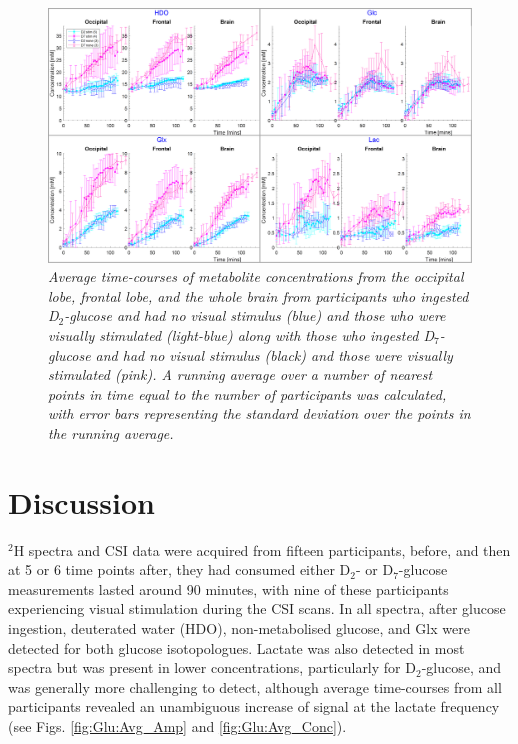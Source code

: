 \begin{figure}
    \centering
    \includegraphics[width = 1\textwidth]{Figures/Glucose/Vis_Stim.png}
    \caption{\textit{Average time-courses of metabolite concentrations from the occipital lobe, frontal lobe, and the whole brain from participants who ingested D$_2$-glucose and had no visual stimulus (blue) and those who were visually stimulated (light-blue) along with those who ingested D$_7$-glucose and had no visual stimulus (black) and those were visually stimulated (pink). A running average over a number of nearest points in time equal to the number of participants was calculated, with error bars representing the standard deviation over the points in the running average.}}
    \label{fig:Glu:Vis_Stim}
\end{figure}

\section{Discussion}

$^2$H spectra and \ac{CSI} data were acquired from fifteen participants, before, and then at 5 or 6 time points after, they had consumed either D$_2$- or D$_7$-glucose measurements lasted around 90 minutes, with nine of these participants experiencing visual stimulation during the \ac{CSI} scans. In all spectra, after glucose ingestion, deuterated water (\ac{HDO}), non-metabolised glucose, and Glx were detected for both glucose isotopologues. Lactate was also detected in most spectra but was present in lower concentrations, particularly for D$_2$-glucose, and was generally more challenging to detect, although average time-courses from all participants revealed an unambiguous increase of signal at the lactate frequency (see Figs. \ref{fig:Glu:Avg_Amp} and \ref{fig:Glu:Avg_Conc}). 

